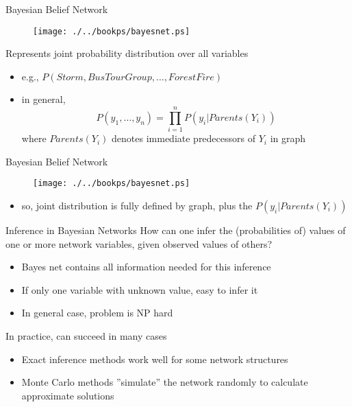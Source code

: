 \documentclass[%
pdf,
colorBG,
slideColor,
tcrico,
]{prosper}
\begin{document}

\begin{slide}{Bayesian Belief Network   }  

\begin{figure}
	\centering
	\texttt{[image: ./../bookps/bayesnet.ps]}
\end{figure} 
\tiny
Represents joint probability distribution over all variables
\begin{itemize}
\item e.g., $P(Storm, BusTourGroup, \ldots, ForestFire)$
\item in general, 
\[P(y_1, \ldots, y_n) = \prod_{i=1}^{n} P(y_i | Parents(Y_i)) \]
where $Parents(Y_i)$ denotes immediate predecessors of $Y_i$ in graph
\end{itemize}
\end{slide}


\begin{slide}{Bayesian Belief Network   }  
\begin{figure}
	\centering
	\texttt{[image: ./../bookps/bayesnet.ps]}
\end{figure} 
\tiny
\begin{itemize}
\item so, joint distribution is fully defined by graph, plus the $P(y_i | Parents(Y_i))$
\end{itemize}
\end{slide}




\begin{slide}{Inference in Bayesian Networks   }  
\tiny
How can one infer the (probabilities of) values of one or more network variables, given observed values of others?

\begin{itemize}
	\item Bayes net contains all information needed for this inference
	\item If only one variable with unknown value, easy to infer it
	\item In general case, problem is NP hard
\end{itemize}

In practice,  can succeed in many cases
\begin{itemize}
	\item Exact inference methods work well for some network structures
	\item Monte Carlo methods ''simulate'' the network randomly to calculate approximate solutions
\end{itemize}
\end{slide}
\end{document}
